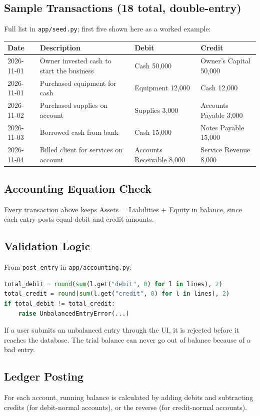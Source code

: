 \documentclass[11pt]{article}
\begin{document}
\subsection*{Sample Transactions (18 total, double-entry)}
Full list in \texttt{app/seed.py}; first five shown here as a worked example:

\begin{longtable}{l p{5.5cm} l l}
\toprule
\textbf{Date} & \textbf{Description} & \textbf{Debit} & \textbf{Credit} \\
\midrule
\endhead
2026-11-01 & Owner invested cash to start the business & Cash 50,000 & Owner's Capital 50,000 \\
2026-11-01 & Purchased equipment for cash & Equipment 12,000 & Cash 12,000 \\
2026-11-02 & Purchased supplies on account & Supplies 3,000 & Accounts Payable 3,000 \\
2026-11-03 & Borrowed cash from bank & Cash 15,000 & Notes Payable 15,000 \\
2026-11-04 & Billed client for services on account & Accounts Receivable 8,000 & Service Revenue 8,000 \\
\bottomrule
\end{longtable}

\subsection*{Accounting Equation Check}
Every transaction above keeps Assets = Liabilities + Equity in
balance, since each entry posts equal debit and credit amounts.

\subsection*{Validation Logic}
From \texttt{post\_entry} in \texttt{app/accounting.py}:

\begin{lstlisting}[language=Python]
total_debit = round(sum(l.get("debit", 0) for l in lines), 2)
total_credit = round(sum(l.get("credit", 0) for l in lines), 2)
if total_debit != total_credit:
    raise UnbalancedEntryError(...)
\end{lstlisting}

If a user submits an unbalanced entry through the UI, it is rejected
before it reaches the database. The trial balance can never go out of
balance because of a bad entry.

\subsection*{Ledger Posting}
For each account, running balance is calculated by adding debits and
subtracting credits (for debit-normal accounts), or the reverse (for
credit-normal accounts).
\end{document}

